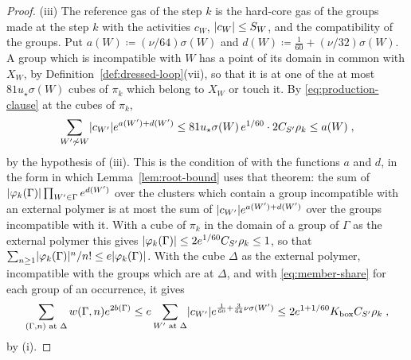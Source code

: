 \documentclass[11pt]{preprint}
\DeclarePairedDelimiter{\abs}{\lvert}{\rvert}
\numberwithin{equation}{section}
\theoremstyle{definition}
\theoremstyle{remark}
\theoremstyle{plain}
\begin{document}
\begin{proof}
(iii) The reference gas of the step $k$ is the hard-core gas of the groups made at the step $k$ with the activities $c_W$, $\abs{c_W} \leq S_W$, and the compatibility of the groups. Put $a(W) \coloneqq (\nu/64)\sigma(W)$ and $d(W) \coloneqq \frac{1}{60} + (\nu/32)\sigma(W)$. A group which is incompatible with $W$ has a point of its domain in common with $X_W$, by Definition~\ref{def:dressed-loop}(vii), so that it is at one of the at most $81u_\star\sigma(W)$ cubes of $\pi_k$ which belong to $X_W$ or touch it. By \eqref{eq:production-clause} at the cubes of $\pi_k$,
\[
    \sum_{W' \not\sim W}\abs{c_{W'}}e^{a(W') + d(W')} \leq 81u_\star\sigma(W)\,e^{1/60}\cdot 2C_{S'}\rho_k \leq a(W)\;,
\]
by the hypothesis of (iii). This is the condition of \cite[Theorem~5.4]{FriedliVelenik} with the functions $a$ and $d$, in the form in which Lemma~\ref{lem:root-bound} uses that theorem: the sum of $\abs{\varphi_k(\Gamma)}\prod_{W' \in \Gamma}e^{d(W')}$ over the clusters which contain a group incompatible with an external polymer is at most the sum of $\abs{c_{W'}}e^{a(W') + d(W')}$ over the groups incompatible with it. With a cube of $\pi_k$ in the domain of a group of $\Gamma$ as the external polymer this gives $\abs{\varphi_k(\Gamma)} \leq 2e^{1/60}C_{S'}\rho_k \leq 1$, so that $\sum_{n \geq 1}\abs{\varphi_k(\Gamma)}^n/n! \leq e\abs{\varphi_k(\Gamma)}$. With the cube $\Delta$ as the external polymer, incompatible with the groups which are at $\Delta$, and with \eqref{eq:member-share} for each group of an occurrence, it gives
\[
    \sum_{(\Gamma, n) \text{ at } \Delta}w(\Gamma, n)e^{2b(\Gamma)} \leq e\sum_{W' \text{ at } \Delta}\abs{c_{W'}}e^{\frac{1}{60} + \frac{3}{64}\nu\sigma(W')} \leq 2e^{1 + 1/60}K_{\mathrm{box}}C_{S'}\rho_k\;,
\]
by (i).


\end{proof}
\end{document}
